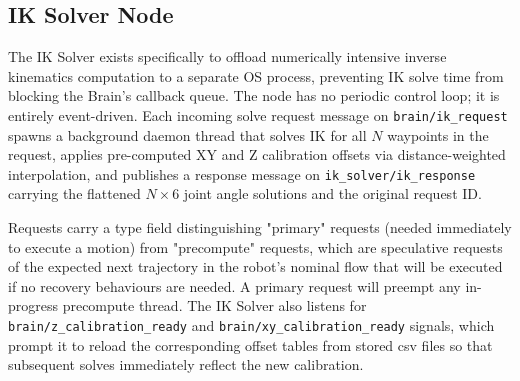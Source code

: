 \subsection{IK Solver Node}

\noindent The IK Solver exists specifically to offload numerically intensive inverse kinematics computation to a separate OS process, preventing IK solve time from blocking the Brain's callback queue. The node has no periodic control loop; it is entirely event-driven. Each incoming solve request message on \texttt{brain/ik\_request} spawns a background daemon thread that solves IK for all $N$ waypoints in the request, applies pre-computed XY and Z calibration offsets via distance-weighted interpolation, and publishes a response message on \texttt{ik\_solver/ik\_response} carrying the flattened $N \times 6$ joint angle solutions and the original request ID.

\noindent Requests carry a type field distinguishing "primary" requests (needed immediately to execute a motion) from "precompute" requests, which are speculative requests of the expected next trajectory in the robot's nominal flow that will be executed if no recovery behaviours are needed. A primary request will preempt any in-progress precompute thread. The IK Solver also listens for \texttt{brain/z\_calibration\_ready} and \texttt{brain/xy\_calibration\_ready} signals, which prompt it to reload the corresponding offset tables from stored csv files so that subsequent solves immediately reflect the new calibration.
